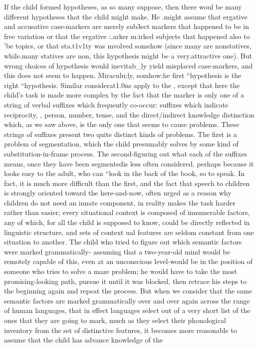 If the child formed hypotheses, as so many suppose, then there woul be many different hypotheses that the  child might make. He .might assume that ergative and accusative case-markers are merely sub3ect markers that happened to be in free variation or that the ergative :{\textquotedbl}.arker m:irked subjects that happened also to 'be topics, or that sta.t1v1ty was mvolved somehow (since many  are non\-statives, while.many statives are non, this hypothesis might be a very.attractive one). But wrong choices of hypothesis would inevit\-ab\_ly yield misplaced case-markers, and this does not seem to happen. Miraculu:ly, somhow:he first ``hypothesis is the right ``hypothesis. Similar considerat1.0ns apply to the  , except
that here the child's task is made more complex by the fact that the  marker is only one of a string of verbal suffixes which fre\-quently co-occur: suffixes which indicate reciprocity, , person, number, tense, and the direct/indirect knowledge distinction which, as we saw above, is the only one that seems to cause problems. These strings of suffixes present two quite distinct kinds of problems. The first is a problem of segmentation, which the child presumably solves by some kind of substitution-in-frame process. The second-figuring out what each of the suffixes means, once they have been segmented\-is less often considered, perhaps because it looks easy to the adult, who can ``look in the back of the book, so to speak. In fact, it is much more difficult than the first, and the fact that speech to children is strongly oriented toward the here-and-now, often urged as a reason why children do not need an innate component, in reality makes the task harder rather than easier; every situational context is composed of innumerable factors, any of which, for all the child is supposed to know, could be directly reflected in linguistic structure, and sets of context ual features are seldom constant from one situation to another. The child who tried to figure out which semantic factors were marked grammatically- assuming that a two-year-old mind would be remotely capable of this, even at an unconscious level-would be in the position of someone who tries to solve a maze problem; he would have to take the most promising-looking path, pursue it until it was blocked, then retrace his steps to the beginning again and repeat the process. But when we consider that the same semantic factors are marked gram\-matically over and over again across the range of human languages, that in effect languages select out of a very short list of  the ones that they are going to mark, much as they select their phonological inventory from the set of distinctive features, it becomes more reasonable to assume that the child has advance knowledge of the
